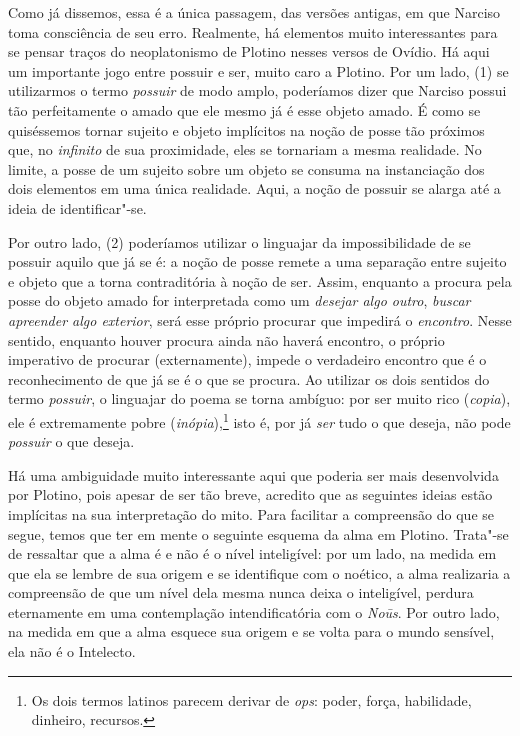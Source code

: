 Como já dissemos, essa é a única passagem, das versões antigas, em
que Narciso toma consciência de seu erro. Realmente, há elementos
muito interessantes para se pensar traços do neoplatonismo de Plotino
nesses versos de Ovídio. Há aqui um importante jogo entre possuir e
ser, muito caro a Plotino. Por um lado, (1) se utilizarmos o termo
\emph{possuir} de modo amplo, poderíamos dizer que Narciso possui tão
perfeitamente o amado que ele mesmo já é esse objeto amado. É como se
quiséssemos tornar sujeito e objeto implícitos na noção de posse tão
próximos que, no \emph{infinito} de sua proximidade, eles se
tornariam a mesma realidade. No limite, a posse de um sujeito sobre
um objeto se consuma na instanciação dos dois elementos em uma única
realidade. Aqui, a noção de possuir se alarga até a ideia de
identificar"-se. 

Por outro lado, (2) poderíamos utilizar o linguajar da
impossibilidade
de se possuir aquilo que já se é: a noção de posse remete a uma
separação entre sujeito e objeto que a torna contraditória à noção de
ser. Assim, enquanto a procura pela posse do objeto amado for
interpretada como um \emph{desejar algo outro}, \emph{buscar
apreender algo exterior}, será esse próprio procurar que impedirá o
\emph{encontro}. Nesse sentido, enquanto houver procura ainda não
haverá encontro, o próprio imperativo de procurar (externamente),
impede o verdadeiro encontro que é o reconhecimento de que já se é o
que se procura. Ao utilizar os dois sentidos do termo \emph{possuir}, o
linguajar do poema se torna ambíguo: por ser muito rico
(\emph{copia}), ele é extremamente pobre
(\emph{inópia}),\footnote{ Os dois termos latinos parecem derivar de
\emph{ops}: poder, força, habilidade, dinheiro, recursos.} isto
é, por já \emph{ser} tudo o que deseja, não pode \emph{possuir} o
que deseja.

Há uma ambiguidade muito interessante aqui que poderia ser mais
desenvolvida por Plotino, pois apesar de ser tão breve, acredito que
as seguintes ideias estão implícitas na sua interpretação do mito.
Para facilitar a compreensão do que se segue, temos que ter em mente
o seguinte esquema da alma em Plotino. Trata"-se de ressaltar que a
alma é e não é o nível inteligível: por um lado, na medida em que ela
se lembre de sua origem e se identifique com o noético, a alma
realizaria a compreensão de que um nível dela mesma nunca deixa o
inteligível, perdura eternamente em uma contemplação intendificatória
com o \emph{Noūs}. Por outro lado, na medida em que a alma esquece
sua origem e se volta para o mundo sensível, ela não é o
Intelecto.

